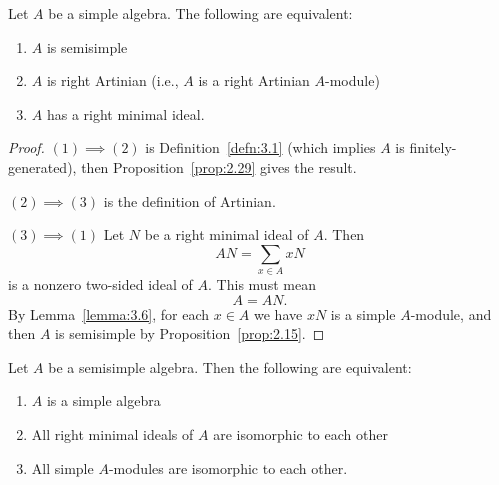 
\lecture{}

\begin{proposition}\label{prop:3.12}
Let $A$ be a simple algebra. The following are equivalent:
\begin{enumerate}
\item $A$ is semisimple
\item $A$ is right Artinian (i.e., $A$ is a right Artinian $A$-module)
\item $A$ has a right minimal ideal.
\end{enumerate}
\end{proposition}

\begin{proof}
$(1)\implies(2)$ is Definition~\ref{defn:3.1} (which implies $A$ is
  finitely-generated), then Proposition~\ref{prop:2.29} gives the
  result.

$(2)\implies(3)$ is the  definition of Artinian.

$(3)\implies(1)$ Let $N$ be a right minimal ideal of $A$. Then
\begin{equation}
AN=\sum_{x\in A}xN
\end{equation}
is a nonzero two-sided ideal of $A$. This must mean
\begin{equation}
A=AN.
\end{equation}
By Lemma~\ref{lemma:3.6}, for each $x\in A$ we have $xN$ is a simple
$A$-module, and then $A$ is semisimple by Proposition~\ref{prop:2.15}.
\end{proof}

\begin{proposition}\label{prop:3.13}
Let $A$ be a semisimple algebra. Then the following are equivalent:
\begin{enumerate}
\item $A$ is a simple algebra
\item All right minimal ideals of $A$ are isomorphic to each other
\item All simple $A$-modules are isomorphic to each other.
\end{enumerate}
\end{proposition}

